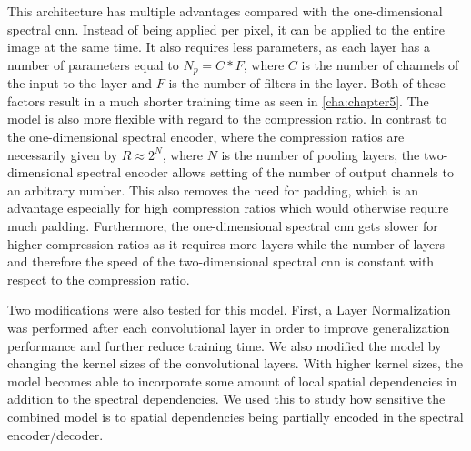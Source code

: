 This architecture has multiple advantages compared with the one-dimensional spectral \ac{cnn}. Instead of being applied per pixel, it can be applied to the entire image at the same time. It also requires less parameters, as each layer has a number of parameters equal to $N_p = C * F$, where $C$ is the number of channels of the input to the layer and $F$ is the number of filters in the layer. Both of these factors result in a much shorter training time as seen in \autoref{cha:chapter5}. The model is also more flexible with regard to the compression ratio. In contrast to the one-dimensional spectral encoder, where the compression ratios are necessarily given by $R \approx 2^N$, where $N$ is the number of pooling layers, the two-dimensional spectral encoder allows setting of the number of output channels to an arbitrary number. This also removes the need for padding, which is an advantage especially for high compression ratios which would otherwise require much padding. Furthermore, the one-dimensional spectral \ac{cnn} gets slower for higher compression ratios as it requires more layers while the number of layers and therefore the speed of the two-dimensional spectral \ac{cnn} is constant with respect to the compression ratio.

Two modifications were also tested for this model. First, a Layer Normalization was performed after each convolutional layer in order to improve generalization performance and further reduce training time.  We also modified the model by changing the kernel sizes of the convolutional layers. With higher kernel sizes, the model becomes able to incorporate some amount of local spatial dependencies in addition to the spectral dependencies. We used this to study how sensitive the combined model is to spatial dependencies being partially encoded in the spectral encoder/decoder.
